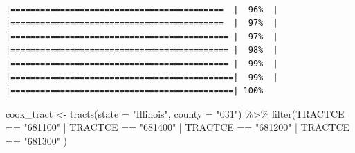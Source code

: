 \documentclass[
  krantz2]{krantz}
\makeatletter
\newenvironment{Shaded}{\begin{snugshade}}{\end{snugshade}}
\newcommand{\AttributeTok}[1]{\textcolor[rgb]{0.61,0.61,0.61}{#1}}
\newcommand{\FunctionTok}[1]{\textcolor[rgb]{0,0,0}{#1}}
\newcommand{\NormalTok}[1]{#1}
\newcommand{\OtherTok}[1]{\textcolor[rgb]{0.37,0.37,0.37}{#1}}
\newcommand{\SpecialCharTok}[1]{\textcolor[rgb]{0,0,0}{#1}}
\newcommand{\StringTok}[1]{\textcolor[rgb]{0.5,0.5,0.5}{#1}}
\newenvironment{kframe}{%
\medskip{}
\setlength{\fboxsep}{.8em}
 \def\at@end@of@kframe{}%
 \ifinner\ifhmode%
  \def\at@end@of@kframe{\end{minipage}}%
  \begin{minipage}{\columnwidth}%
 \fi\fi%
 \def\FrameCommand##1{\hskip\@totalleftmargin \hskip-\fboxsep
 \colorbox{shadecolor}{##1}\hskip-\fboxsep
     \hskip-\linewidth \hskip-\@totalleftmargin \hskip\columnwidth}%
 \MakeFramed {\advance\hsize-\width
   \@totalleftmargin\z@ \linewidth\hsize
   \@setminipage}}%
 {\par\unskip\endMakeFramed%
 \at@end@of@kframe}
\renewenvironment{Shaded}{\begin{kframe}}{\end{kframe}}
\makeatother
\begin{document}
\begin{verbatim}
                             |===========================================  |  96%  |                                                     |===========================================  |  97%  |                                                     |============================================ |  97%  |                                                     |============================================ |  98%  |                                                     |============================================ |  99%  |                                                     |=============================================|  99%  |                                                     |=============================================| 100%
\end{verbatim}

\begin{Shaded}
\begin{Highlighting}[]
\NormalTok{cook\_tract }\OtherTok{\textless{}{-}} \FunctionTok{tracts}\NormalTok{(}\AttributeTok{state =} \StringTok{"Illinois"}\NormalTok{, }\AttributeTok{county =} \StringTok{"031"}\NormalTok{) }\SpecialCharTok{\%\textgreater{}\%} 
  \FunctionTok{filter}\NormalTok{(TRACTCE }\SpecialCharTok{==} \StringTok{"681100"} \SpecialCharTok{|}\NormalTok{ TRACTCE }\SpecialCharTok{==} \StringTok{"681400"} \SpecialCharTok{|} 
\NormalTok{           TRACTCE }\SpecialCharTok{==} \StringTok{"681200"} \SpecialCharTok{|}\NormalTok{ TRACTCE }\SpecialCharTok{==} \StringTok{"681300"}\NormalTok{ )}
\end{Highlighting}
\end{Shaded}
\end{document}
